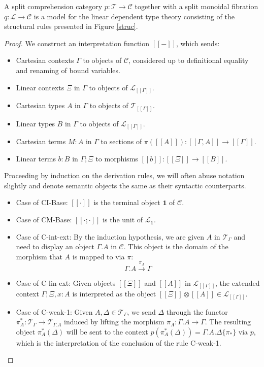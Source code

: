 \documentclass[a4paper,english]{lipics-v2018}
\begin{document}
\begin{theorem}\label{interpret}
A split comprehension category $p : \mathcal{T} \to \mathcal{C}$ together with a split monoidal fibration $q : \mathcal{L} \to \mathcal{C}$ is a model for the linear dependent type theory consisting of the structural rules presented in Figure \ref{struc}.
\begin{proof}
  We construct an interpretation function $[[-]]$, which sends:
  \begin{itemize}
  \item Cartesian contexts $\Gamma$ to objects of $\mathcal{C}$, considered up to definitional equality and renaming of bound variables.
  \item Linear contexts $\Xi$ in $\Gamma$ to objects of $\mathcal{L}_{[[\Gamma]]}$.
  \item Cartesian types $A$ in $\Gamma$ to objects of $\mathcal{T}_{[[\Gamma]]}$.
  \item Linear types $B$ in $\Gamma$ to objects of $\mathcal{L}_{[[\Gamma]]}$.
  \item Cartesian terms $M : A$ in $\Gamma$ to sections of $\pi([[A]]) : [[\Gamma,A]] \to [[\Gamma]]$.
  \item Linear terms $b : B$ in $\Gamma; \Xi$ to morphisms $[[b]] : [[\Xi]] \to [[B]]$.
  \end{itemize}
Proceeding by induction on the derivation rules, we will often abuse notation slightly and denote semantic objects the same as their syntactic counterparts.
\begin{itemize}
\item Case of CI-Base: $[[\cdot]]$ is the terminal object $\mathbf{1}$ of $\mathcal{C}$.
\item Case of CM-Base: $[[\cdot; \cdot]]$ is the unit of $\mathcal{L}_{\mathbf{1}}$.
\item Case of C-int-ext: By the induction hypothesis, we are given $A$ in $\mathcal{T}_{\Gamma}$ and need to display an object $\Gamma.A$ in $\mathcal{C}$. This object is the domain of the morphism that $A$ is mapped to via $\pi$:
  \[\Gamma.A \xrightarrow {\pi_A} \Gamma\]
\item Case of C-lin-ext: Given objects $[[\Xi]]$ and $[[A]]$ in $\mathcal{L}_{[[\Gamma]]}$, the extended context $\Gamma; \Xi, x : A$ is interpreted as the object $[[\Xi]] \otimes [[A]] \in \mathcal{L}_{[[\Gamma]]}$.
\item Case of C-weak-1: Given $A, \Delta \in \mathcal{T}_{\Gamma}$, we send $\Delta$ through the functor $\pi_A^* : \mathcal{T}_\Gamma \to \mathcal{T}_{\Gamma.A}$ induced by lifting the morphism $\pi_A : \Gamma.A \to \Gamma$. The resulting object $\pi_A^*(\Delta)$ will be sent to the context $p(\pi_A^*(\Delta)) = \Gamma.A.\Delta\{\pi_*\}$ via $p$, which is the interpretation of the conclusion of the rule C-weak-1.

\end{itemize}
\end{proof}
\end{theorem}
\end{document}
